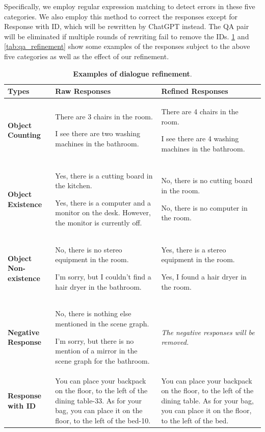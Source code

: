 Specifically, we employ regular expression matching to detect errors in these five categories. We also employ this method to correct the responses except for Response with ID, which will be rewritten by ChatGPT instead. The QA pair will be eliminated if multiple rounds of rewriting fail to remove the IDs. \cref{tab:dialogue_refinement} and \cref{tab:qa_refinement} show some examples of the responses subject to the above five categories as well as the effect of our refinement. 
\begin{table}[t!]
    \centering
    \small
    \caption{\textbf{Examples of dialogue refinement}.}
    \begin{tabular}{l|p{4.5cm}|p{4.5cm}}
        \toprule
        \textbf{Types} & \textbf{Raw Responses} & \textbf{Refined Responses}\\
        \midrule
        \textbf{Object Counting} & There are 3 chairs in the room.
        
        I see there are two washing machines in the bathroom.
        & There are 4 chairs in the room.

        I see there are 4 washing machines in the bathroom. \\
        \midrule
        \textbf{Object Existence} & Yes, there is a cutting board in the kitchen.
        
        Yes, there is a computer and a monitor on the desk. However, the monitor is currently off.
        &  No, there is no cutting board in the room.
        
        No, there is no computer in the room.
        \\
        \midrule
        \textbf{Object Non-existence} & No, there is no stereo equipment in the room.
        
        I'm sorry, but I couldn't find a hair dryer in the bathroom.
        &Yes, there is a stereo equipment in the room.
        
        Yes, I found a hair dryer in the room.
        \\
        \midrule
        \textbf{Negative Response} &  
        No, there is nothing else mentioned in the scene graph. 
        
        I'm sorry, but there is no mention of a mirror in the scene graph for the bathroom.
        &

        \textit{The negative responses will be removed.} \\
        \midrule
        \textbf{Response with ID}  & You can place your backpack on the floor, to the left of the dining table-33. As for your bag, you can place it on the floor, to the left of the bed-10.
        &
        You can place your backpack on the floor, to the left of the dining table. As for your bag, you can place it on the floor, to the left of the bed.
        \\
        \bottomrule
    \end{tabular}
    \label{tab:dialogue_refinement}
\end{table}

